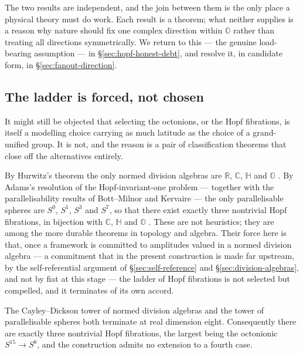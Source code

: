 The two results are independent, and the join between them is the only place a physical theory must do work. Each result is a theorem; what neither supplies is a reason why nature should fix one complex direction within $\mathbb{O}$ rather than treating all directions symmetrically. We return to this --- the genuine load-bearing assumption --- in \S\ref{sec:hopf-honest-debt}, and resolve it, in candidate form, in \S\ref{sec:fanout-direction}.

\subsection{The ladder is forced, not chosen}

It might still be objected that selecting the octonions, or the Hopf fibrations, is itself a modelling choice carrying as much latitude as the choice of a grand-unified group. It is not, and the reason is a pair of classification theorems that close off the alternatives entirely.

By Hurwitz's theorem the only normed division algebras are $\mathbb{R}$, $\mathbb{C}$, $\mathbb{H}$ and $\mathbb{O}$ \autocite{hurwitz1898composition,baez2002octonions}. By Adams's resolution of the Hopf-invariant-one problem --- together with the parallelisability results of Bott--Milnor and Kervaire --- the only parallelisable spheres are $S^0$, $S^1$, $S^3$ and $S^7$, so that there exist exactly three nontrivial Hopf fibrations, in bijection with $\mathbb{C}$, $\mathbb{H}$ and $\mathbb{O}$ \autocite{adams1960hopf,bottmilnor1958parallelizability,kervaire1958nonparallelizability}. These are not heuristics; they are among the more durable theorems in topology and algebra. Their force here is that, once a framework is committed to amplitudes valued in a normed division algebra --- a commitment that in the present construction is made far upstream, by the self-referential argument of \S\ref{sec:self-reference} and \S\ref{sec:division-algebras}, and not by fiat at this stage --- the ladder of Hopf fibrations is not selected but compelled, and it terminates of its own accord.

\begin{proposition}[Termination]\label{prop:termination}
The Cayley--Dickson tower of normed division algebras and the tower of parallelisable spheres both terminate at real dimension eight. Consequently there are exactly three nontrivial Hopf fibrations, the largest being the octonionic $S^{15} \to S^8$, and the construction admits no extension to a fourth case.
\end{proposition}

